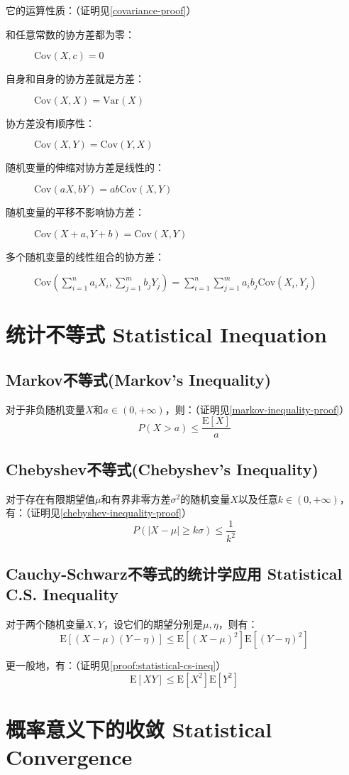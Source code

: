\documentclass[UTF8]{ctexbook}
\begin{document}
它的运算性质：（证明见\ref{covariance-proof}）
\begin{description}
	\item [和任意常数的协方差都为零：]
	$\mathrm{Cov}(X, c)=0$
	\item [自身和自身的协方差就是方差：]
	$\mathrm{Cov}(X, X)=\mathrm{Var}(X)$
	\item [协方差没有顺序性：]
	$\mathrm{Cov}(X, Y)=\mathrm{Cov}(Y, X)$
	\item [随机变量的伸缩对协方差是线性的：]
	$\mathrm{Cov}(aX, bY)=ab\mathrm{Cov}(X, Y)$
	\item [随机变量的平移不影响协方差：]
	$\mathrm{Cov}(X+a, Y+b)=\mathrm{Cov}(X, Y)$
	\item [多个随机变量的线性组合的协方差：]
	$\mathrm{Cov}(\sum_{i=1}^na_iX_i, \sum_{j=1}^mb_jY_j)=\sum_{i=1}^n\sum_{j=1}^ma_ib_j\mathrm{Cov}(X_i, Y_j)$
\end{description}
\section{统计不等式 Statistical Inequation}
\subsection{Markov不等式(Markov's Inequality)}
\label{markov-inequality}
对于非负随机变量$X$和$a\in(0,+\infty)$，则：（证明见\ref{markov-inequality-proof}）
\[
	P(X>a)\leq\frac{\mathrm E[X]}{a}
\]

\subsection{Chebyshev不等式(Chebyshev's Inequality)}
\label{chebyshev-inequality}
对于存在有限期望值$\mu$和有界非零方差$\sigma^2$的随机变量$X$以及任意$k\in(0,+\infty)$，有：（证明见\ref{chebyshev-inequality-proof}）
\[
	P(|X-\mu|\geq k\sigma)\leq\frac{1}{k^2}
\]
\subsection{Cauchy-Schwarz不等式的统计学应用 Statistical C.S. Inequality}
\label{thm:statistical-cs-ineq}
对于两个随机变量$X,Y$，设它们的期望分别是$\mu, \eta$，则有：
\[
	\mathrm E[(X-\mu)(Y-\eta)]\leq\mathrm E[(X-\mu)^2]\mathrm E[(Y-\eta)^2]
\]

更一般地，有：（证明见\ref{proof:statistical-cs-ineq}）
\[
	\mathrm E[XY]\leq\mathrm E[X^2]\mathrm E[Y^2]
\]

\section{概率意义下的收敛 Statistical Convergence}
\end{document}
